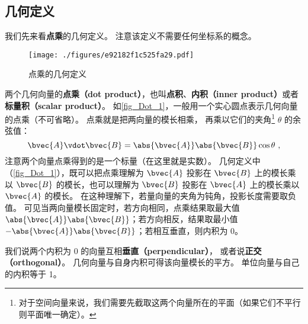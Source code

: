 

\subsection{几何定义}
我们先来看\textbf{点乘}的几何定义。 注意该定义不需要任何坐标系的概念。
\begin{figure}[th]
\centering
\texttt{[image: ./figures/e92182f1c525fa29.pdf]}
\caption{点乘的几何定义}\label{fig_Dot_1}
\end{figure}

两个几何向量的\textbf{点乘（dot product）}，也叫\textbf{点积}、\textbf{内积（inner product）}或者\textbf{标量积（scalar product）}。 如\autoref{fig_Dot_1}，一般用一个实心圆点表示几何向量的点乘（不可省略）。 点乘就是把两向量的模长相乘， 再乘以它们的夹角\footnote{对于空间向量来说，我们需要先截取这两个向量所在的平面（如果它们不平行则平面唯一确定）。} $\theta$ 的余弦值：
\begin{equation}\label{eq_Dot_1}
\bvec{A} \vdot \bvec{B} = \abs{\bvec{A}} \abs{\bvec{B}} \cos\theta ~,
\end{equation}
注意两个向量点乘得到的是一个标量（在这里就是实数）。 几何定义中（\autoref{fig_Dot_1}），既可以把点乘理解为 $\bvec{A}$ 投影在 $\bvec{B}$ 上的模长乘以 $\bvec{B}$ 的模长，也可以理解为 $\bvec{B}$ 投影在 $\bvec{A}$ 上的模长乘以 $\bvec{A}$ 的模长。 在这种理解下，若量向量的夹角为钝角，投影长度需要取负值。 可见当两向量模长固定时，若方向相同，点乘结果取最大值 $\abs{\bvec{A}}\abs{\bvec{B}}$；若方向相反，结果取最小值 $-\abs{\bvec{A}}\abs{\bvec{B}}$；若相互垂直，则内积为 0。

我们说两个内积为 0 的向量互相\textbf{垂直（perpendicular）}， 或者说\textbf{正交（orthogonal）}。 几何向量与自身内积可得该向量模长的平方。 单位向量与自己的内积等于 1。 


